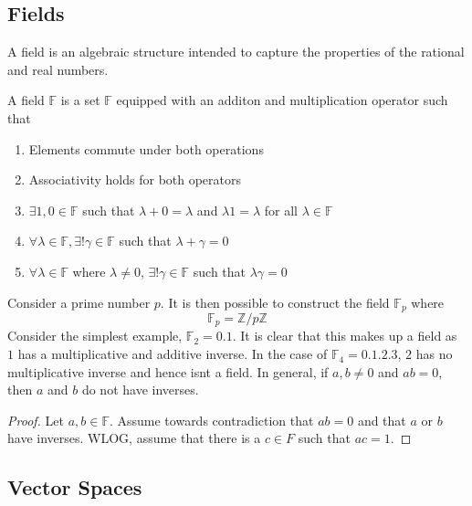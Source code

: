\documentclass[../notes.tex]{subfiles}
\begin{document}

\subsection{Fields}

A field is an algebraic structure intended to capture the properties of the rational and real numbers.

\begin{definition}[Field]
	A field $\mathbb{F}$ is a set $\mathbb{F}$ equipped with an additon and multiplication operator such that
	\begin{enumerate}
		\item Elements commute under both operations
		\item Associativity holds for both operators
		\item $\exists 1,0 \in \mathbb{F}$ such that $\lambda + 0 = \lambda$ and $\lambda 1 = \lambda$ for all $\lambda \in \mathbb{F}$
		\item $\forall \lambda \in \mathbb{F}, \exists! \gamma \in \mathbb{F}$ such that $\lambda + \gamma = 0$
		\item $\forall \lambda \in \mathbb{F}$ where $\lambda \neq 0$, $\exists! \gamma \in \mathbb{F}$ such that $\lambda\gamma = 0$
	\end{enumerate}
\end{definition}

Consider a prime number $p$. It is then possible to construct the field $\mathbb{F}_p$ where
\[
	\mathbb{F}_p = \mathbb{Z}/p\mathbb{Z}
\]
Consider the simplest example, $\mathbb{F}_2 = \qty{0, 1}$. It is clear that this makes up a field as $1$ has a multiplicative and additive inverse. In the case of $\mathbb{F}_4 = \qty{0,1,2,3}$, $2$ has no multiplicative inverse and hence isnt a field. In general, if $a,b \neq 0$ and $ab = 0$, then $a$ and $b$ do not have inverses.

\begin{proof}
	Let $a,b \in \mathbb{F}$. Assume towards contradiction that $ab = 0$ and that $a$ or $b$ have inverses. WLOG, assume that there is a $c \in F$ such that $ac = 1$.
\end{proof}

\subsection{Vector Spaces}
\end{document}
